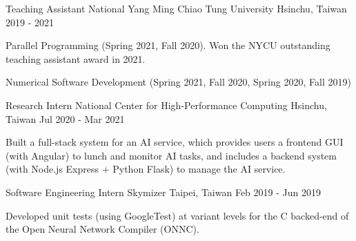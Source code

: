 

\begin{cventries}

  \cventry
    {Teaching Assistant} %
    {National Yang Ming Chiao Tung University} %
    {Hsinchu, Taiwan} %
    {2019 - 2021} %
    {
      \begin{cvitems} %
        \item {Parallel Programming (Spring 2021, Fall 2020). Won the NYCU outstanding teaching assistant award in 2021.}
        \item {Numerical Software Development (Spring 2021, Fall 2020, Spring 2020, Fall 2019)}
      \end{cvitems}
    }

    \vspace{-2mm}

  \cventry
    {Research Intern} %
    {National Center for High-Performance Computing} %
    {Hsinchu, Taiwan} %
    {Jul 2020 - Mar 2021} %
    {
      \begin{cvitems} %
        \item {Built a full-stack system for an AI service,
              which provides users a frontend GUI (with Angular) to lunch and monitor AI tasks,
              and includes a backend system (with Node.js Express + Python Flask) to manage the AI service.}
      \end{cvitems}
    }

    \vspace{-2mm}

  \cventry
    {Software Engineering Intern} %
    {Skymizer} %
    {Taipei, Taiwan} %
    {Feb 2019 - Jun 2019} %
    {
      \begin{cvitems} %
        \item {Developed unit tests (using GoogleTest) at variant levels for the C backed-end of the Open Neural Network Compiler (ONNC).}
      \end{cvitems}
    }


\end{cventries}
